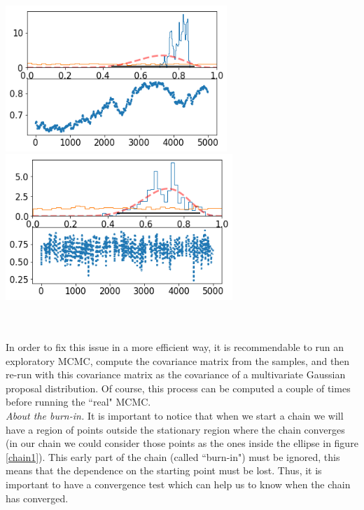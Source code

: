 \documentclass[onecolumn,           %
               showpacs,            %
               preprintnumbers,     %
               aps,                 %
               letterpaper,             %
               superscriptaddress,      %
               nofootinbib,         %
               tightenlines,        %
               floats,floatfix      %
               ,usenatbib,
               ]{revtex4-1}
\begin{document}
\begin{minipage}{\textwidth}
\centering
\includegraphics[height=5.5cm]{Figures/chain2.png}
\includegraphics[height=5.5cm]{Figures/chain3.png}
\label{chainprop}
\end{minipage}\\ $ $ \\

In order to fix this issue in a more efficient way, it is recommendable to run an exploratory MCMC, compute the covariance matrix from the samples, and then re-run with this covariance matrix as the covariance of a multivariate Gaussian proposal distribution. Of course, this process can be computed a couple of times before running the ``real" MCMC.\\

\textit{About the burn-in.} It is important to notice that when we start a chain we will have a region of points outside the stationary region where the chain converges (in our chain we could consider those points as the ones inside the ellipse in figure \ref{chain1}). This early part of the chain (called ``burn-in") must be ignored, this means that the dependence on the starting point must be lost. Thus, it is important to have a convergence test which can help us to know when the chain has converged.\\
\end{document}
